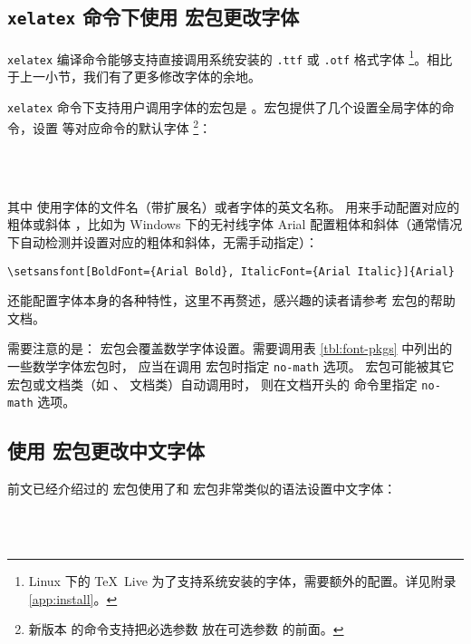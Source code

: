 \subsection{\texttt{xelatex} 命令下使用  宏包更改字体}\label{subsec:fontspec}

\texttt{xelatex} 编译命令能够支持直接调用系统安装的 \texttt{.ttf} 或 \texttt{.otf} 格式字体%
\footnote{Linux 下的 \TeX\ Live 为了支持系统安装的字体，需要额外的配置。详见附录 \ref{app:install}。}。相比于上一小节，我们有了更多修改字体的余地。

\texttt{xelatex} 命令下支持用户调用字体的宏包是 。宏包提供了几个设置全局字体的命令，设置  等对应命令的默认字体%
\footnote{新版本  的命令支持把必选参数  放在可选参数  的前面。}：
\begin{command}
 \\
 \\
\end{command}
其中  使用字体的文件名（带扩展名）或者字体的英文名称。 用来手动配置对应的粗体或斜体
，比如为 Windows 下的无衬线字体 Arial 配置粗体和斜体（通常情况下自动检测并设置对应的粗体和斜体，无需手动指定）：
\begin{verbatim}
\setsansfont[BoldFont={Arial Bold}, ItalicFont={Arial Italic}]{Arial}
\end{verbatim}
 还能配置字体本身的各种特性，这里不再赘述，感兴趣的读者请参考  宏包的帮助文档。

需要注意的是： 宏包会覆盖数学字体设置。需要调用表 \ref{tbl:font-pkgs} 中列出的一些数学字体宏包时，
应当在调用  宏包时指定 \texttt{no-math} 选项。 宏包可能被其它宏包或文档类（如 、 文档类）自动调用时，
则在文档开头的  命令里指定 \texttt{no-math} 选项。

\subsection{使用  宏包更改中文字体}\label{subsec:CJKfont}

前文已经介绍过的  宏包使用了和  宏包非常类似的语法设置中文字体：
\begin{command}
 \\
 \\
\end{command}

